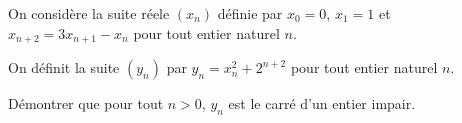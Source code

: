 \documentclass[varwidth]{standalone}
\begin{document}
    On consid\`ere la suite r\'eele $(x_n)$ d\'efinie par $x_0 = 0$, $x_1 = 1$ et $x_{n + 2} = 3x_{n + 1} - x_n$ pour tout entier naturel $n$.

    On d\'efinit la suite $(y_n)$ par $y_n = x_n^2 + 2^{n + 2}$ pour tout entier naturel $n$.

    D\'emontrer que pour tout $n > 0$, $y_n$ est le carr\'e d'un entier impair.
\end{document}

